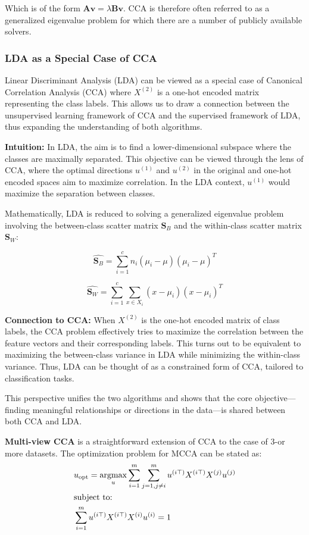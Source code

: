 Which is of the form $\mathbf{A v} = \lambda \mathbf{B v}$. CCA is therefore often referred to as a generalized eigenvalue problem for which there are a number of publicly available solvers.

\subsubsection{LDA as a Special Case of CCA}

Linear Discriminant Analysis (LDA) can be viewed as a special case of Canonical Correlation Analysis (CCA) where \(X^{(2)}\) is a one-hot encoded matrix representing the class labels. This allows us to draw a connection between the unsupervised learning framework of CCA and the supervised framework of LDA, thus expanding the understanding of both algorithms.

\textbf{Intuition:} In LDA, the aim is to find a lower-dimensional subspace where the classes are maximally separated. This objective can be viewed through the lens of CCA, where the optimal directions \(u^{(1)}\) and \(u^{(2)}\) in the original and one-hot encoded spaces aim to maximize correlation. In the LDA context, \(u^{(1)}\) would maximize the separation between classes.

Mathematically, LDA is reduced to solving a generalized eigenvalue problem involving the between-class scatter matrix \(\mathbf{S}_B\) and the within-class scatter matrix \(\mathbf{S}_W\):

\[
    \hat{\mathbf{S}_B} = \sum_{i=1}^{c} n_i (\mu_i - \mu)(\mu_i - \mu)^T
\]

\[
    \hat{\mathbf{S}_W} = \sum_{i=1}^{c} \sum_{x \in X_i} (x - \mu_i)(x - \mu_i)^T
\]

\textbf{Connection to CCA:} When \(X^{(2)}\) is the one-hot encoded matrix of class labels, the CCA problem effectively tries to maximize the correlation between the feature vectors and their corresponding labels. This turns out to be equivalent to maximizing the between-class variance in LDA while minimizing the within-class variance. Thus, LDA can be thought of as a constrained form of CCA, tailored to classification tasks.

This perspective unifies the two algorithms and shows that the core objective—finding meaningful relationships or directions in the data—is shared between both CCA and LDA.

\textbf{Multi-view CCA} is a straightforward extension of CCA to the case of 3-or more datasets.
The optimization problem for MCCA can be stated as:
\begin{align}
     & u_{\text{opt}} = \underset{u}{\mathrm{argmax}} \sum_{i=1}^{m} \sum_{j=1, j \neq i}^{m} u^{(i\top)} X^{(i\top)} X^{(j)} u^{(j)} \\
     & \text{subject to:} \notag \\
     & \sum_{i=1}^{m} u^{(i\top)} X^{(i\top)} X^{(i)} u^{(i)} = 1 \notag
\end{align}

